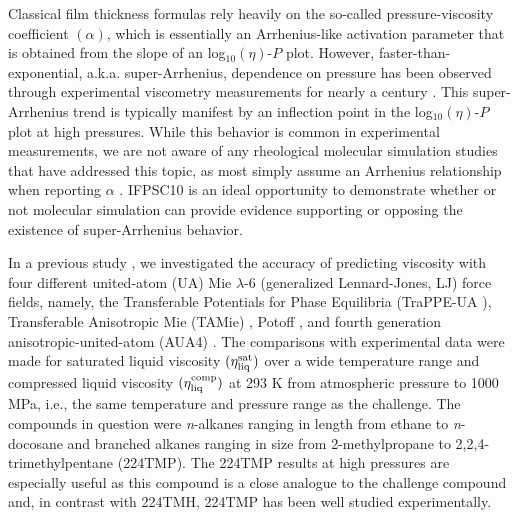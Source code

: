 \documentclass[preprint,review,12pt]{elsarticle}
\begin{document}
	Classical film thickness formulas rely heavily on the so-called pressure-viscosity coefficient $(\alpha)$, which is essentially an Arrhenius-like activation parameter that is obtained from the slope of an log$_{10}(\eta)$-$P$ plot. However, faster-than-exponential, a.k.a. super-Arrhenius, dependence on pressure has been observed through experimental viscometry measurements for nearly a century \cite{Bair2016}. This super-Arrhenius trend is typically manifest by an inflection point in the log$_{10}(\eta)$-$P$ plot at high pressures. While this behavior is common in experimental measurements, we are not aware of any rheological molecular simulation studies that have addressed this topic, as most simply assume an Arrhenius relationship when reporting $\alpha$ \cite{Mundy1996,McCabe2001,Liu2015}. IFPSC10 is an ideal opportunity to demonstrate whether or not molecular simulation can provide evidence supporting or opposing the existence of super-Arrhenius behavior.
	
	
	In a previous study \cite{Postdoc_3}, we investigated the accuracy of predicting viscosity with four different united-atom (UA) Mie $\lambda$-6 (generalized Lennard-Jones, LJ) force fields, namely, the Transferable Potentials for Phase Equilibria (TraPPE-UA \cite{TraPPE,Martin1999,TraPPEUA2}), Transferable Anisotropic Mie (TAMie) \cite{TAMie,Weidler2016}, Potoff \cite{Mie,Potoff_branched}, and fourth generation anisotropic-united-atom (AUA4) \cite{AUA4,Nieto2008}. The comparisons with experimental data were made for saturated liquid viscosity $(\eta_{\rm liq}^{\rm sat})$ over a wide temperature range and compressed liquid viscosity $(\eta_{\rm liq}^{\rm comp})$ at 293 K from atmospheric pressure to 1000 MPa, i.e., the same temperature and pressure range as the challenge. The compounds in question were \textit{n}-alkanes ranging in length from ethane to \textit{n}-docosane and branched alkanes ranging in size from 2-methylpropane to 2,2,4-trimethylpentane (224TMP). The 224TMP results at high pressures are especially useful as this compound is a close analogue to the challenge compound and, in contrast with 224TMH, 224TMP has been well studied experimentally.
	
\end{document}
